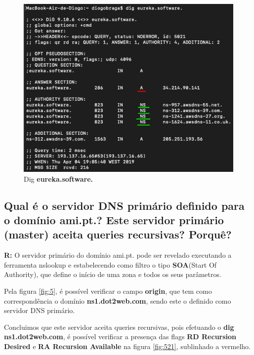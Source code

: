 \documentclass{llncs}
\begin{document}
\begin{figure}[H]
\begin{center}
\includegraphics[scale=0.6]{4.png}
\end{center}
\caption{\label{fig:4}Dig \textbf{eureka.software.}}
\end{figure}


\subsection{\textbf{Qual é o servidor DNS primário definido para o domínio ami.pt.? Este servidor primário (master) aceita queries recursivas? Porquê?}}
\textbf{R:} O servidor primário do domínio ami.pt. pode ser revelado executando a ferramenta nslookup e estabelecendo como filtro o tipo \textbf{SOA}(Start Of Authority), que define o início de uma zona e todos os seus parâmetros.

Pela figura \ref{fig:5}, é possível verificar o campo \textbf{origin}, que tem como correspondência o domínio \textbf{ns1.dot2web.com}, sendo este o definido como servidor DNS primário.

Concluimos que este servidor aceita queries recursivas, pois efetuando o \textbf{dig ns1.dot2web.com}, é possível verificar a presença das flags \textbf{RD Recursion Desired} e \textbf{RA Recursion Available} na figura \ref{fig:521}, sublinhado a vermelho.
\end{document}
